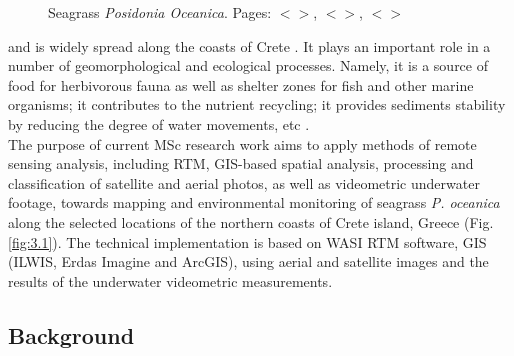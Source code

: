 \documentclass[11pt]{article}
\begin{document}
\begin{figure}[H]
	\centering
	\hspace{2mm}
	\caption{Seagrass \textit{Posidonia Oceanica}. Pages: $<$\pageref{page-1}$>$, $<$\pageref{page-3}$>$, $<$\pageref{page-5}$>$}
	\label{fig:1}
\end{figure}

and is widely spread along the coasts of Crete \cite{Dumay02} \label{Dumay02}. 
It plays an important role in a number
of geomorphological and ecological processes. Namely, it is a source of food for herbivorous fauna as
well as shelter zones for fish and other marine organisms; it contributes to the nutrient recycling; it
provides sediments stability by reducing the degree of water movements, etc \cite{Francour99}\label{Francour99}.\\
The purpose of current MSc research work aims to apply methods of remote sensing analysis, including \ac{RTM}, 
\ac{GIS}-based spatial analysis, processing and classification of satellite and aerial photos, as well as videometric underwater footage, towards mapping and environmental monitoring of seagrass \textit{P. oceanica} along the selected locations of the northern coasts of Crete island, Greece (Fig.\ref{fig:3.1})\label{page-2}. The technical implementation is based on \ac{WASI} \ac{RTM} software, \ac{GIS} (\ac{ILWIS}, Erdas Imagine and ArcGIS), using aerial and satellite images and the results of the underwater videometric measurements. 

\subsection{Background}\label{page-2}
\end{document}
